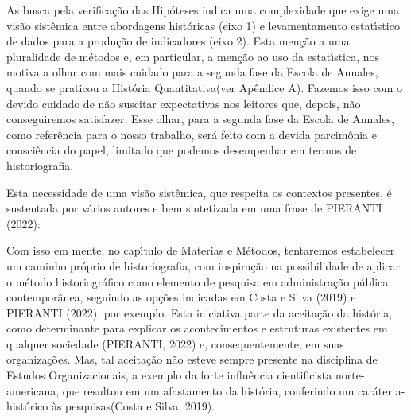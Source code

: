 \documentclass[
12pt,		%
openright,	%
twoside,  %
a4paper,			%
chapter=TITLE,		%
english,			%
french,				%
spanish,			%
brazil				%
]{USPSC-classe/USPSC}
\begin{document}
As busca pela verifica\c{c}\~ao das Hip\'oteses indica uma complexidade que exige uma vis\~ao sist\^emica entre abordagens hist\'oricas (eixo 1) e levamentamento estat\'{\i}stico de dados para a produ\c{c}\~ao de indicadores (eixo 2). Esta men\c{c}\~ao a uma pluralidade de m\'etodos e, em particular, a men\c{c}\~ao ao uso da estat\'{\i}stica, nos motiva a olhar com mais cuidado para a segunda fase da Escola de Annales, quando se praticou a \textquotedbl Hist\'oria Quantitativa\textquotedbl  (ver Ap\^endice A). Fazemos isso com o devido cuidado de n\~ao suscitar expectativas nos leitores que, depois, n\~ao conseguiremos satisfazer. Esse olhar, para a segunda fase da Escola de Annales, como refer\^encia para o nosso trabalho, ser\'a feito com a devida parcim\^onia e consci\^encia do papel, limitado que podemos desempenhar em termos de historiografia.








Esta necessidade de uma vis\~ao sist\^emica, que respeita os contextos presentes, \'e sustentada por v\'arios autores e bem sintetizada em uma frase de PIERANTI (2022):









\noindent\begin{center}\mbox{\centering{}}\end{center}


Com isso em mente, no cap\'{\i}tulo de Materias e M\'etodos, tentaremos estabelecer um caminho pr\'oprio de historiografia, com inspira\c{c}\~ao na possibilidade de aplicar o m\'etodo historiogr\'afico como elemento de pesquisa em administra\c{c}\~ao p\'ublica contempor\^anea, seguindo as op\c{c}\~oes indicadas em   Costa e Silva (2019) e PIERANTI (2022), por exemplo. Esta iniciativa parte da aceita\c{c}\~ao da hist\'oria, como determinante para explicar os acontecimentos e estruturas existentes em qualquer sociedade (PIERANTI, 2022) e, consequentemente, em suas organiza\c{c}\~oes. Mas, tal aceita\c{c}\~ao n\~ao esteve sempre presente na disciplina de Estudos Organizacionais, a exemplo da \textquotedbl forte influ\^encia cientificista norte-americana, que resultou em um afastamento da hist\'oria, conferindo um car\'ater a-hist\'orico \`as pesquisas\textquotedbl   (Costa e Silva, 2019).
\end{document}
